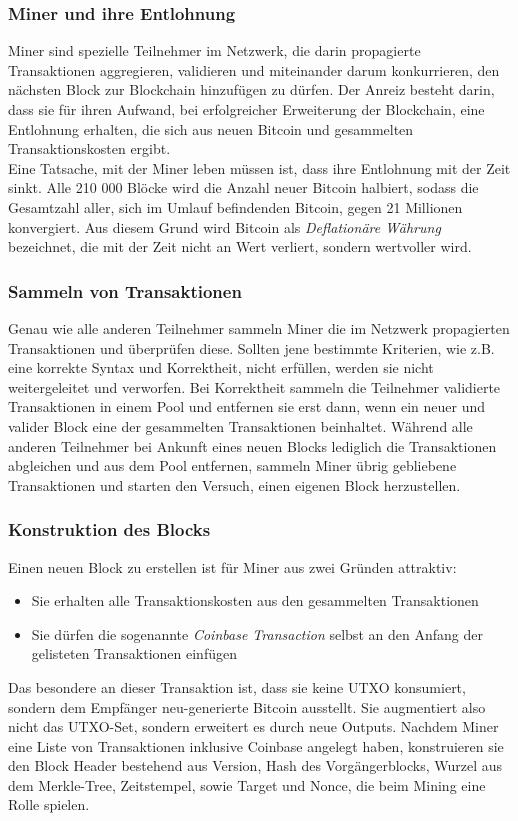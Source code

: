 \subsubsection{Miner und ihre Entlohnung}
Miner sind spezielle Teilnehmer im Netzwerk, die darin propagierte Transaktionen aggregieren, validieren und miteinander darum konkurrieren, den nächsten Block zur Blockchain hinzufügen zu dürfen. 
Der Anreiz besteht darin, dass sie für ihren Aufwand, bei erfolgreicher Erweiterung der Blockchain, eine Entlohnung erhalten, die sich aus neuen Bitcoin und gesammelten Transaktionskosten ergibt.\\
Eine Tatsache, mit der Miner leben müssen ist, dass ihre Entlohnung mit der Zeit sinkt. 
Alle 210 000 Blöcke wird die Anzahl neuer Bitcoin halbiert, sodass die Gesamtzahl aller, sich im Umlauf befindenden Bitcoin, gegen 21 Millionen konvergiert. 
Aus diesem Grund wird Bitcoin als \emph{Deflationäre Währung} bezeichnet, die mit der Zeit nicht an Wert verliert, sondern wertvoller wird.
\subsubsection{Sammeln von Transaktionen}
Genau wie alle anderen Teilnehmer sammeln Miner die im Netzwerk propagierten Transaktionen und überprüfen diese. Sollten jene bestimmte Kriterien, wie z.B. eine korrekte Syntax und Korrektheit, nicht erfüllen, werden sie nicht weitergeleitet und verworfen.
Bei Korrektheit sammeln die Teilnehmer validierte Transaktionen in einem Pool und entfernen sie erst dann, wenn ein neuer und valider Block eine der gesammelten Transaktionen beinhaltet. 
Während alle anderen Teilnehmer bei Ankunft eines neuen Blocks lediglich die Transaktionen abgleichen und aus dem Pool entfernen, sammeln Miner übrig gebliebene Transaktionen und starten den Versuch, einen eigenen Block herzustellen.
\subsubsection{Konstruktion des Blocks}
Einen neuen Block zu erstellen ist für Miner aus zwei Gründen attraktiv:
\begin{itemize}
\item Sie erhalten alle Transaktionskosten aus den gesammelten Transaktionen
\item Sie dürfen die sogenannte \emph{Coinbase Transaction} selbst an den Anfang der gelisteten Transaktionen einfügen
\end{itemize}
Das besondere an dieser Transaktion ist, dass sie keine UTXO konsumiert, sondern dem Empfänger neu-generierte Bitcoin ausstellt. Sie augmentiert also nicht das UTXO-Set, sondern erweitert es durch neue Outputs.
Nachdem Miner eine Liste von Transaktionen inklusive Coinbase angelegt haben, konstruieren sie den Block Header bestehend aus Version, Hash des Vorgängerblocks, Wurzel aus dem Merkle-Tree, Zeitstempel, sowie Target und Nonce, die beim Mining eine Rolle spielen.
